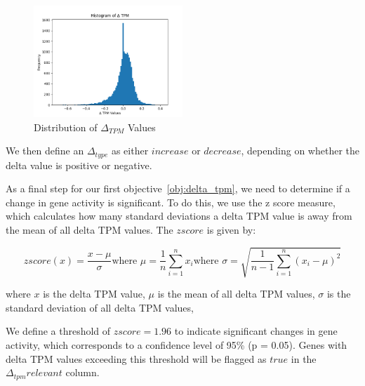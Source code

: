 \begin{figure}[h]
\centering
\includegraphics[width=0.5\textwidth]{figures/03_02_delta_tpm}
\caption{Distribution of $\Delta_{TPM}$ Values}
\label{fig:03_02_delta_tpm}
\end{figure}

We then define an $\Delta_{type}$ as either $increase$ or $decrease$, depending on whether the delta value is positive or negative.

As a final step for our first objective~\ref{obj:delta_tpm}, we need to determine if a change in gene activity is significant. %
To do this, we use the z score measure, which calculates how many standard deviations a delta TPM value is away
from the mean of all delta TPM values.
The $z score$ is given by:

\begin{subequations}
    \begin{equation} \label{eq:z_score}
        z score (x) = \frac{x - {\mu}}{\sigma}
    \end{equation}
    \begin{equation}
        \text{where } \mu = \frac{1}{n} \sum_{i=1}^{n} x_i
        \label{eq:mean}
    \end{equation}
    \begin{equation}
        \text{where } \sigma = \sqrt{\frac{1}{n-1} \sum_{i=1}^{n} (x_i - \mu)^2}
        \label{eq:std}
    \end{equation}
\end{subequations}

where $x$ is the delta TPM value, $\mu$ is the mean of all delta TPM values, $\sigma$ is the standard deviation of all delta TPM values,

We define a threshold of  $z score = 1.96$ to indicate significant changes in gene activity,
which corresponds to a confidence level of 95\% (p = 0.05).
Genes with delta TPM values exceeding this threshold will be flagged as $true$ in the $\Delta_{tpm} relevant$ column.

